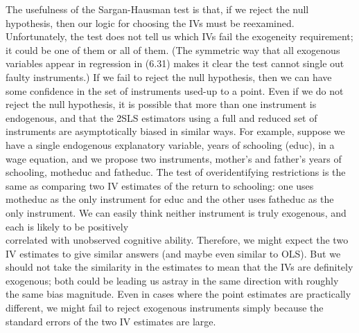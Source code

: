 \documentclass[10pt]{article}
\begin{document}
The usefulness of the Sargan-Hausman test is that, if we reject the null hypothesis, then our logic for choosing the IVs must be reexamined. Unfortunately, the test does not tell us which IVs fail the exogeneity requirement; it could be one of them or all of them. (The symmetric way that all exogenous variables appear in regression in (6.31) makes it clear the test cannot single out faulty instruments.) If we fail to reject the null hypothesis, then we can have some confidence in the set of instruments used-up to a point. Even if we do not reject the null hypothesis, it is possible that more than one instrument is endogenous, and that the 2SLS estimators using a full and reduced set of instruments are asymptotically biased in similar ways. For example, suppose we have a single endogenous explanatory variable, years of schooling (educ), in a wage equation, and we propose two instruments, mother's and father's years of schooling, motheduc and fatheduc. The test of overidentifying restrictions is the same as comparing two IV estimates of the return to schooling: one uses motheduc as the only instrument for educ and the other uses fatheduc as the only instrument. We can easily think neither instrument is truly exogenous, and each is likely to be positively\\
correlated with unobserved cognitive ability. Therefore, we might expect the two IV estimates to give similar answers (and maybe even similar to OLS). But we should not take the similarity in the estimates to mean that the IVs are definitely exogenous; both could be leading us astray in the same direction with roughly the same bias magnitude. Even in cases where the point estimates are practically different, we might fail to reject exogenous instruments simply because the standard errors of the two IV estimates are large.
\end{document}
